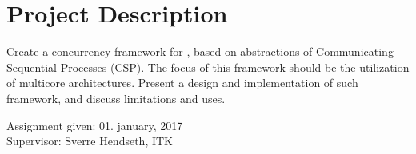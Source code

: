 \setcounter{page}{0}
\newpage
{}
\section*{Project Description}
\label{sec:project_description}

Create a concurrency framework for \Cpp{}, based on abstractions of Communicating Sequential Processes (CSP). The focus of this framework should be the utilization of multicore architectures. Present a design and implementation of such framework, and discuss limitations and uses.

\begin{flushleft}
Assignment given: 01. january, 2017\\
Supervisor: Sverre Hendseth, ITK
\end{flushleft}


\afterpage{\blankpage}
